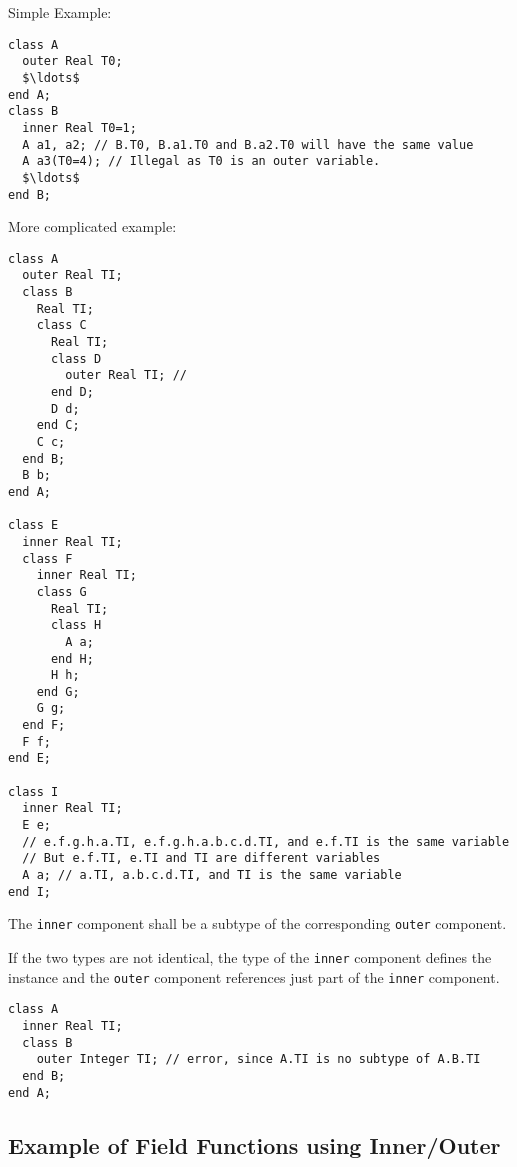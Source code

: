 \begin{example}
Simple Example:
\begin{lstlisting}[language=modelica]
class A
  outer Real T0;
  $\ldots$
end A;
class B
  inner Real T0=1;
  A a1, a2; // B.T0, B.a1.T0 and B.a2.T0 will have the same value
  A a3(T0=4); // Illegal as T0 is an outer variable.
  $\ldots$
end B;
\end{lstlisting}
More complicated example:
\begin{lstlisting}[language=modelica]
class A
  outer Real TI;
  class B
    Real TI;
    class C
      Real TI;
      class D
        outer Real TI; //
      end D;
      D d;
    end C;
    C c;
  end B;
  B b;
end A;

class E
  inner Real TI;
  class F
    inner Real TI;
    class G
      Real TI;
      class H
        A a;
      end H;
      H h;
    end G;
    G g;
  end F;
  F f;
end E;

class I
  inner Real TI;
  E e;
  // e.f.g.h.a.TI, e.f.g.h.a.b.c.d.TI, and e.f.TI is the same variable
  // But e.f.TI, e.TI and TI are different variables
  A a; // a.TI, a.b.c.d.TI, and TI is the same variable
end I;
\end{lstlisting}
\end{example}

The \lstinline!inner! component shall be a subtype of the corresponding \lstinline!outer! component.

\begin{nonnormative}
If the two types are not identical, the type of the \lstinline!inner! component defines the instance and the \lstinline!outer! component references just part of the
\lstinline!inner! component.
\end{nonnormative}

\begin{example}
\begin{lstlisting}[language=modelica]
class A
  inner Real TI;
  class B
    outer Integer TI; // error, since A.TI is no subtype of A.B.TI
  end B;
end A;
\end{lstlisting}
\end{example}


\subsection{Example of Field Functions using Inner/Outer}\label{example-of-field-functions-using-inner-outer}

